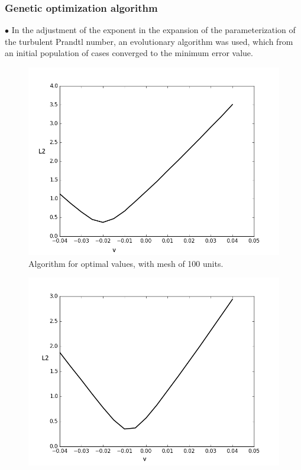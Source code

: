 \documentclass[xcolor=dvipsnames,8pt,aspectratio=34]{beamer}
\begin{document}
		
			\begin{frame}
		\frametitle{Genetic optimization algorithm}
		$\bullet$ In the adjustment of the exponent in the expansion of the parameterization of the turbulent Prandtl number, an evolutionary algorithm was used, which from an initial population of cases converged to the minimum error value.\\ 
		\begin{minipage}[h!]{0.32\textwidth}
			\begin{figure}
				\centering
				\includegraphics[angle=0, scale=0.19]{A100}
				\caption{Algorithm for optimal values, with mesh of 100 units.}
			\end{figure}
		\end{minipage}
		\begin{minipage}[h!]{0.32\textwidth}
			\begin{figure}
				\centering
				\includegraphics[angle=0, scale=0.19]{A400}

\end{figure}
\end{minipage}
\end{frame}
\end{document}
